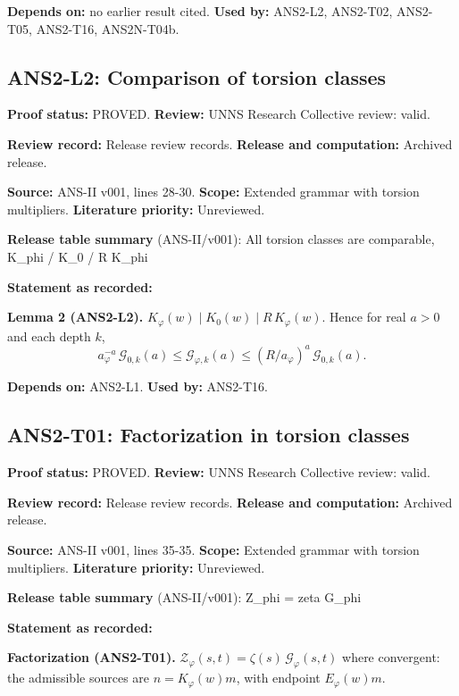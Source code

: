 \documentclass[
  11pt,
]{article}
\begin{document}
\textbf{Depends on:} no earlier result cited. \textbf{Used by:} ANS2-L2,
ANS2-T02, ANS2-T05, ANS2-T16, ANS2N-T04b.

\hypertarget{ans2-l2-comparison-of-torsion-classes}{%
\subsection{ANS2-L2: Comparison of torsion
classes}\label{ans2-l2-comparison-of-torsion-classes}}

\textbf{Proof status:} PROVED. \textbf{Review:} UNNS Research Collective
review: valid.

\textbf{Review record:} Release review records. \textbf{Release and
computation:} Archived release.

\textbf{Source:} ANS-II v001, lines 28-30. \textbf{Scope:} Extended
grammar with torsion multipliers. \textbf{Literature priority:}
Unreviewed.

\textbf{Release table summary} (ANS-II/v001): All torsion classes are
comparable, K\_phi / K\_0 / R K\_phi

\textbf{Statement as recorded:}

\textbf{Lemma 2 (ANS2-L2).}
\(K_\varphi(w)\mid K_0(w)\mid R\,K_\varphi(w)\). Hence for real \(a>0\)
and each depth \(k\),
\[a_\varphi^{-a}\,\mathcal G_{0,k}(a)\le\mathcal G_{\varphi,k}(a)\le(R/a_\varphi)^{a}\,\mathcal G_{0,k}(a).\]

\textbf{Depends on:} ANS2-L1. \textbf{Used by:} ANS2-T16.

\hypertarget{ans2-t01-factorization-in-torsion-classes}{%
\subsection{ANS2-T01: Factorization in torsion
classes}\label{ans2-t01-factorization-in-torsion-classes}}

\textbf{Proof status:} PROVED. \textbf{Review:} UNNS Research Collective
review: valid.

\textbf{Review record:} Release review records. \textbf{Release and
computation:} Archived release.

\textbf{Source:} ANS-II v001, lines 35-35. \textbf{Scope:} Extended
grammar with torsion multipliers. \textbf{Literature priority:}
Unreviewed.

\textbf{Release table summary} (ANS-II/v001): Z\_phi = zeta G\_phi

\textbf{Statement as recorded:}

\textbf{Factorization (ANS2-T01).}
\(\mathcal Z_\varphi(s,t)=\zeta(s)\,\mathcal G_\varphi(s,t)\) where
convergent: the admissible sources are \(n=K_\varphi(w)m\), with
endpoint \(E_\varphi(w)m\).
\end{document}
